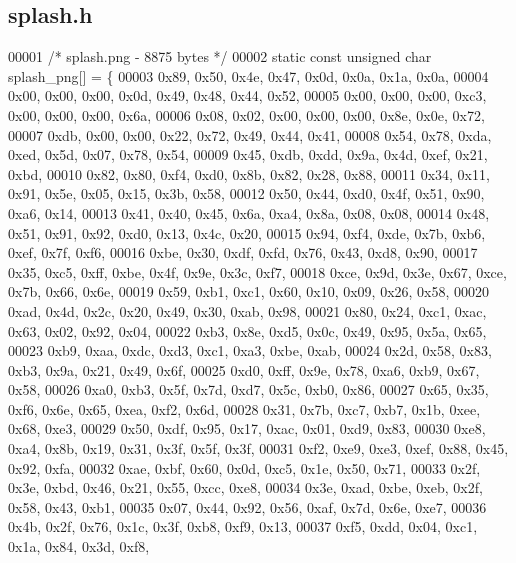 \subsection{splash.\+h}
\label{splash_8h_source}

\begin{DoxyCode}
00001 \textcolor{comment}{/* splash.png - 8875 bytes */}
00002 \textcolor{keyword}{static} \textcolor{keyword}{const} \textcolor{keywordtype}{unsigned} \textcolor{keywordtype}{char} splash_png[] = \{
00003   0x89, 0x50, 0x4e, 0x47, 0x0d, 0x0a, 0x1a, 0x0a,
00004   0x00, 0x00, 0x00, 0x0d, 0x49, 0x48, 0x44, 0x52,
00005   0x00, 0x00, 0x00, 0xc3, 0x00, 0x00, 0x00, 0x6a,
00006   0x08, 0x02, 0x00, 0x00, 0x00, 0x8e, 0x0e, 0x72,
00007   0xdb, 0x00, 0x00, 0x22, 0x72, 0x49, 0x44, 0x41,
00008   0x54, 0x78, 0xda, 0xed, 0x5d, 0x07, 0x78, 0x54,
00009   0x45, 0xdb, 0xdd, 0x9a, 0x4d, 0xef, 0x21, 0xbd,
00010   0x82, 0x80, 0xf4, 0xd0, 0x8b, 0x82, 0x28, 0x88,
00011   0x34, 0x11, 0x91, 0x5e, 0x05, 0x15, 0x3b, 0x58,
00012   0x50, 0x44, 0xd0, 0x4f, 0x51, 0x90, 0xa6, 0x14,
00013   0x41, 0x40, 0x45, 0x6a, 0xa4, 0x8a, 0x08, 0x08,
00014   0x48, 0x51, 0x91, 0x92, 0xd0, 0x13, 0x4c, 0x20,
00015   0x94, 0xf4, 0xde, 0x7b, 0xb6, 0xef, 0x7f, 0xf6,
00016   0xbe, 0x30, 0xdf, 0xfd, 0x76, 0x43, 0xd8, 0x90,
00017   0x35, 0xc5, 0xff, 0xbe, 0x4f, 0x9e, 0x3c, 0xf7,
00018   0xce, 0x9d, 0x3e, 0x67, 0xce, 0x7b, 0x66, 0x6e,
00019   0x59, 0xb1, 0xc1, 0x60, 0x10, 0x09, 0x26, 0x58,
00020   0xad, 0x4d, 0x2c, 0x20, 0x49, 0x30, 0xab, 0x98,
00021   0x80, 0x24, 0xc1, 0xac, 0x63, 0x02, 0x92, 0x04,
00022   0xb3, 0x8e, 0xd5, 0x0c, 0x49, 0x95, 0x5a, 0x65,
00023   0xb9, 0xaa, 0xdc, 0xd3, 0xc1, 0xa3, 0xbe, 0xab,
00024   0x2d, 0x58, 0x83, 0xb3, 0x9a, 0x21, 0x49, 0x6f,
00025   0xd0, 0xff, 0x9e, 0x78, 0xa6, 0xb9, 0x67, 0x58,
00026   0xa0, 0xb3, 0x5f, 0x7d, 0xd7, 0x5c, 0xb0, 0x86,
00027   0x65, 0x35, 0xf6, 0x6e, 0x65, 0xea, 0xf2, 0x6d,
00028   0x31, 0x7b, 0xc7, 0xb7, 0x1b, 0xee, 0x68, 0xe3,
00029   0x50, 0xdf, 0x95, 0x17, 0xac, 0x01, 0xd9, 0x83,
00030   0xe8, 0xa4, 0x8b, 0x19, 0x31, 0x3f, 0x5f, 0x3f,
00031   0xf2, 0xe9, 0xe3, 0xef, 0x88, 0x45, 0x92, 0xfa,
00032   0xae, 0xbf, 0x60, 0x0d, 0xc5, 0x1e, 0x50, 0x71,
00033   0x2f, 0x3e, 0xbd, 0x46, 0x21, 0x55, 0xcc, 0xe8,
00034   0x3e, 0xad, 0xbe, 0xeb, 0x2f, 0x58, 0x43, 0xb1,
00035   0x07, 0x44, 0x92, 0x56, 0xaf, 0x7d, 0x6e, 0xe7,
00036   0x4b, 0x2f, 0x76, 0x1c, 0x3f, 0xb8, 0xf9, 0x13,
00037   0xf5, 0xdd, 0x04, 0xc1, 0x1a, 0x84, 0x3d, 0xf8,

\end{DoxyCode}
